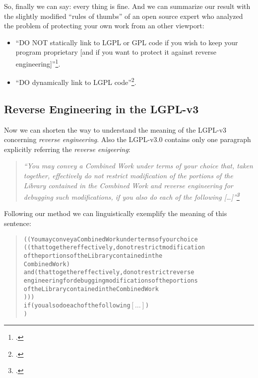 So, finally we can say: every thing is fine. And we can summarize our result
with the slightly modified \enquote{rules of thumbs} of an open source expert
who analyzed the problem of protecting your own work from an other viewport:

\begin{itemize}
  \item \enquote{DO NOT statically link to LGPL or GPL code if you wish to keep
  your program proprietary [and if you want to protect it against reverse
  engineering]}\footcite[cf.][6]{Ilardi2010a}.
  \item \enquote{DO dynamically link to LGPL
  code}\footcite[cf.][6]{Ilardi2010a}.
\end{itemize}

\subsection{Reverse Engineering in the LGPL-v3}

Now we can shorten the way to understand the meaning of the LGPL-v3 concerning
\emph{reverse engineering}. Also the LGPL-v3.0 contains only one paragraph
explicitly referring the \emph{reverse enigeering}: 

\begin{quote}\emph{
\enquote{You may convey a Combined Work under terms of your choice that,
taken together, effectively do not restrict modification of the portions
of the Library contained in the Combined Work and reverse engineering for
debugging such modifications, if you also do each of the following
[\ldots]}\footcite[cf.][\nopage wp]{Lgpl30OsiLicense2007a}}
\end{quote}

Following our method we can linguistically exemplify the meaning
of this sentence:

\begin{quote}
\begin{alltt}   
(   ( You may convey a Combined Work under terms of your choice
		 (   (that together effectively, do not restrict modification
		      of the portions of the Library contained in the 
		      Combined Work)
 	     and (that together effectively, do not restrict reverse 
 	          engineering for debugging modifications of the portions
 	          of the Library contained in the Combined Work
 	 )   )    )
     if ( you also do each of the following \([\ldots]\))
)
\end{alltt}
\end{quote}


